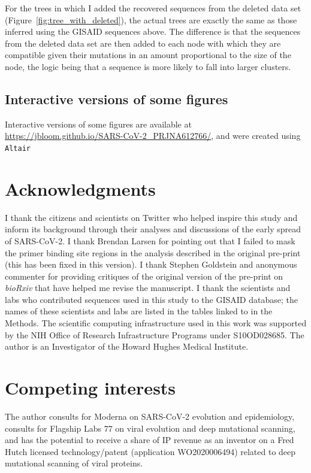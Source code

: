 \documentclass[9pt,twocolumn,twoside]{gsajnl_modified}
\begin{document}
{For the trees in which I added the recovered sequences from the deleted data set (Figure~\ref{fig:tree_with_deleted}), the actual trees are exactly the same as those inferred using the GISAID sequences above.
The difference is that the sequences from the deleted data set are then added to each node with which they are compatible given their mutations in an amount proportional to the size of the node, the logic being that a sequence is more likely to fall into larger clusters.

\subsection{Interactive versions of some figures}
Interactive versions of some figures are available at \url{https://jbloom.github.io/SARS-CoV-2_PRJNA612766/}, and were created using \texttt{Altair}~\citep{vanderplas2018altair}

\section{Acknowledgments}
I thank the citizens and scientists on Twitter who helped inspire this study and inform its background through their analyses and discussions of the early spread of SARS-CoV-2.
I thank Brendan Larsen for pointing out that I failed to mask the primer binding site regions in the analysis described in the original pre-print (this has been fixed in this version).
I thank Stephen Goldstein and anonymous commenter for providing critiques of the original version of the pre-print on \textit{bioRxiv} that have helped me revise the manuscript.
I thank the scientists and labs who contributed sequences used in this study to the GISAID database; the names of these scientists and labs are listed in the tables linked to in the Methods.
The scientific computing infrastructure used in this work was supported by the NIH Office of Research Infrastructure Programs under S10OD028685.
The author is an Investigator of the Howard Hughes Medical Institute.

\section{Competing interests}
The author consults for Moderna on SARS-CoV-2 evolution and epidemiology, consults for Flagship Labs 77 on viral evolution and deep mutational scanning, and has the potential to receive a share of IP revenue as an inventor on a Fred Hutch licensed technology/patent (application WO2020006494) related to deep mutational scanning of viral proteins.

}
\end{document}
